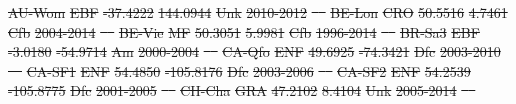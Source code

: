\documentclass[hess, manuscript]{copernicus}
\providecommand{\DIFdeltex}[1]{{\protect\color{red}\sout{#1}}}                      %
\providecommand{\DIFdel}[1]{\texorpdfstring{\DIFdeltex{#1}}{}} %
\begin{document}
\DIFdel{AU-Wom }%
\DIFdel{EBF }%
\DIFdel{-37.4222 }%
\DIFdel{144.0944 }%
\DIFdel{Unk }%
\DIFdel{2010-2012 }%
\DIFdel{\mbox{%
\cite{AU-Wom} }%
}%
\DIFdel{BE-Lon }%
\DIFdel{CRO }%
\DIFdel{50.5516 }%
\DIFdel{4.7461 }%
\DIFdel{Cfb }%
\DIFdel{2004-2014 }%
\DIFdel{\mbox{%
\cite{BE-Lon} }%
}%
\DIFdel{BE-Vie }%
\DIFdel{MF }%
\DIFdel{50.3051 }%
\DIFdel{5.9981 }%
\DIFdel{Cfb }%
\DIFdel{1996-2014 }%
\DIFdel{\mbox{%
\cite{BE-Vie} }%
}%
\DIFdel{BR-Sa3 }%
\DIFdel{EBF }%
\DIFdel{-3.0180 }%
\DIFdel{-54.9714 }%
\DIFdel{Am }%
\DIFdel{2000-2004 }%
\DIFdel{\mbox{%
\cite{BR-Sa3} }%
}%
\DIFdel{CA-Qfo }%
\DIFdel{ENF }%
\DIFdel{49.6925 }%
\DIFdel{-74.3421 }%
\DIFdel{Dfc }%
\DIFdel{2003-2010 }%
\DIFdel{\mbox{%
\cite{CA-Qfo} }%
}%
\DIFdel{CA-SF1 }%
\DIFdel{ENF }%
\DIFdel{54.4850 }%
\DIFdel{-105.8176 }%
\DIFdel{Dfc }%
\DIFdel{2003-2006 }%
\DIFdel{\mbox{%
\cite{CA-SF1} }%
}%
\DIFdel{CA-SF2 }%
\DIFdel{ENF }%
\DIFdel{54.2539 }%
\DIFdel{-105.8775 }%
\DIFdel{Dfc }%
\DIFdel{2001-2005 }%
\DIFdel{\mbox{%
\cite{CA-SF1} }%
}%
\DIFdel{CH-Cha }%
\DIFdel{GRA }%
\DIFdel{47.2102 }%
\DIFdel{8.4104 }%
\DIFdel{Unk }%
\DIFdel{2005-2014 }%
\DIFdel{\mbox{%
\cite{CH-Cha} }%
}%
\end{document}
